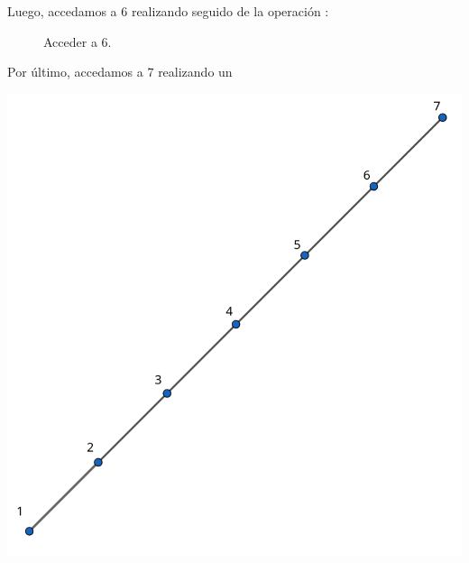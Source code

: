 \newpage
Luego, accedamos a $6$ realizando  seguido de la operación :

\begin{center}
  \begin{figure}[h]
    \centering
    \caption*{Acceder a 6.}
    \label{f:animales}
  \end{figure}

\end{center}

Por último, accedamos a $7$ realizando un 

\begin{center}
  \includegraphics[scale=0.3]{./10.png}
\end{center}

